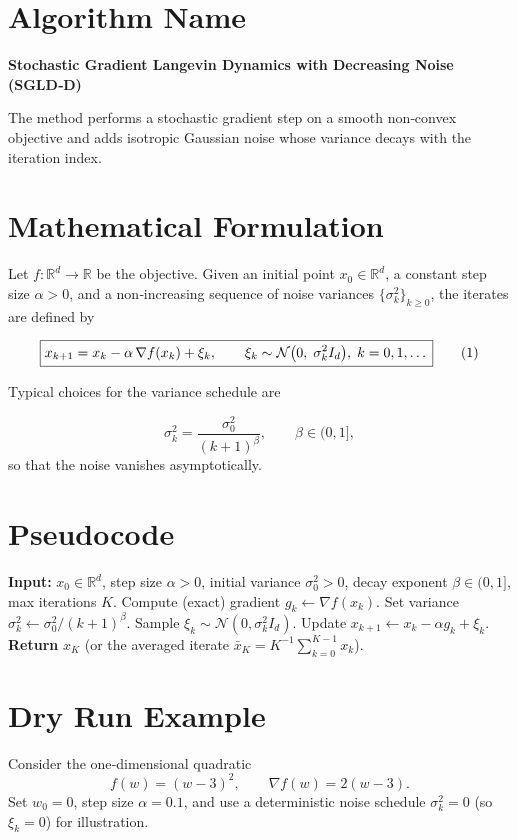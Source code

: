 \documentclass{article}
\begin{document}
\section*{Algorithm Name}
\textbf{Stochastic Gradient Langevin Dynamics with Decreasing Noise (SGLD‑D)}  

The method performs a stochastic gradient step on a smooth non‑convex objective and adds isotropic Gaussian noise whose variance decays with the iteration index.  

\section*{Mathematical Formulation}
Let $f:\mathbb{R}^{d}\rightarrow\mathbb{R}$ be the objective.  
Given an initial point $x_{0}\in\mathbb{R}^{d}$, a constant step size $\alpha>0$, and a non‑increasing sequence of noise variances $\{\sigma_{k}^{2}\}_{k\ge 0}$, the iterates are defined by  

\[
\boxed{%
x_{k+1}=x_{k}-\alpha\,\nabla f(x_{k})+\xi_{k},\qquad 
\xi_{k}\sim\mathcal{N}\bigl(0,\; \sigma_{k}^{2}I_{d}\bigr),\; k=0,1,\dots
}
\tag{1}
\]

Typical choices for the variance schedule are  

\[
\sigma_{k}^{2}= \frac{\sigma_{0}^{2}}{(k+1)^{\beta}},\qquad\beta\in(0,1],
\tag{2}
\]
so that the noise vanishes asymptotically.  

\section*{Pseudocode}
\begin{algorithm}[H]
\caption{SGLD‑D}
\begin{algorithmic}[1]
\State \textbf{Input:} $x_{0}\in\mathbb{R}^{d}$, step size $\alpha>0$, initial variance $\sigma_{0}^{2}>0$, decay exponent $\beta\in(0,1]$, max iterations $K$.
    \State Compute (exact) gradient $g_{k}\gets\nabla f(x_{k})$.
    \State Set variance $\sigma_{k}^{2}\gets \sigma_{0}^{2}/(k+1)^{\beta}$.
    \State Sample $\xi_{k}\sim\mathcal{N}(0,\sigma_{k}^{2}I_{d})$.
    \State Update $x_{k+1}\gets x_{k}-\alpha g_{k}+\xi_{k}$.
\EndFor
\State \textbf{Return} $x_{K}$ (or the averaged iterate $\bar x_{K}=K^{-1}\sum_{k=0}^{K-1}x_{k}$).
\end{algorithmic}
\end{algorithm}

\section*{Dry Run Example}
Consider the one‑dimensional quadratic  
\[
f(w)=(w-3)^{2},\qquad \nabla f(w)=2(w-3).
\]
Set $w_{0}=0$, step size $\alpha=0.1$, and use a deterministic noise schedule $\sigma_{k}^{2}=0$ (so $\xi_{k}=0$) for illustration.  
\end{document}
